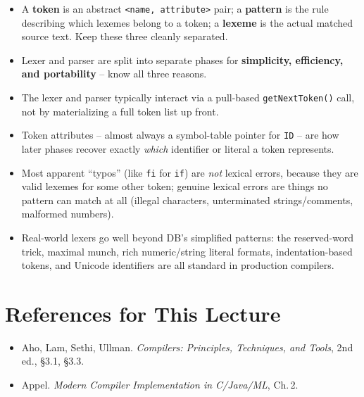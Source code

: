 \documentclass[11pt]{article}
\begin{document}
\begin{takeaways}
\begin{itemize}
  \item A \textbf{token} is an abstract \texttt{<name, attribute>} pair; a \textbf{pattern} is
  the rule describing which lexemes belong to a token; a \textbf{lexeme} is the actual matched
  source text. Keep these three cleanly separated.
  \item Lexer and parser are split into separate phases for \textbf{simplicity, efficiency, and
  portability} -- know all three reasons.
  \item The lexer and parser typically interact via a pull-based \texttt{getNextToken()} call,
  not by materializing a full token list up front.
  \item Token attributes -- almost always a symbol-table pointer for \texttt{ID} -- are how
  later phases recover exactly \emph{which} identifier or literal a token represents.
  \item Most apparent ``typos'' (like \texttt{fi} for \texttt{if}) are \emph{not} lexical errors,
  because they are valid lexemes for some other token; genuine lexical errors are things no
  pattern can match at all (illegal characters, unterminated strings/comments, malformed
  numbers).
  \item Real-world lexers go well beyond DB's simplified patterns: the reserved-word trick,
  maximal munch, rich numeric/string literal formats, indentation-based tokens, and Unicode
  identifiers are all standard in production compilers.
\end{itemize}
\end{takeaways}

\section*{References for This Lecture}
\begin{itemize}
  \item [DB] Aho, Lam, Sethi, Ullman. \textit{Compilers: Principles, Techniques, and Tools}, 2nd ed., \S3.1, \S3.3.
  \item [AP] Appel. \textit{Modern Compiler Implementation in C/Java/ML}, Ch.\,2.
\end{itemize}
\end{document}
